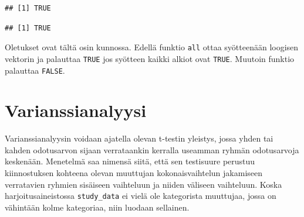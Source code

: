 \documentclass[
]{book}
\newenvironment{Shaded}{\begin{snugshade}}{\end{snugshade}}
\newcommand{\CommentTok}[1]{\textcolor[rgb]{0.56,0.35,0.01}{\textit{#1}}}
\newcommand{\DecValTok}[1]{\textcolor[rgb]{0.00,0.00,0.81}{#1}}
\newcommand{\FloatTok}[1]{\textcolor[rgb]{0.00,0.00,0.81}{#1}}
\newcommand{\FunctionTok}[1]{\textcolor[rgb]{0.00,0.00,0.00}{#1}}
\newcommand{\NormalTok}[1]{#1}
\newcommand{\OtherTok}[1]{\textcolor[rgb]{0.56,0.35,0.01}{#1}}
\newcommand{\SpecialCharTok}[1]{\textcolor[rgb]{0.00,0.00,0.00}{#1}}
\newcommand{\StringTok}[1]{\textcolor[rgb]{0.31,0.60,0.02}{#1}}
\begin{document}
\begin{verbatim}
## [1] TRUE
\end{verbatim}

\begin{Shaded}
\end{Shaded}

\begin{verbatim}
## [1] TRUE
\end{verbatim}

Oletukset ovat tältä osin kunnossa. Edellä funktio \texttt{all} ottaa syötteenään loogisen vektorin ja palauttaa \texttt{TRUE} jos syötteen kaikki alkiot ovat \texttt{TRUE}. Muutoin funktio palauttaa \texttt{FALSE}.

\hypertarget{anova}{%
\section{Varianssianalyysi}\label{anova}}

Varianssianalyysin voidaan ajatella olevan t-testin yleistys, jossa yhden tai kahden odotusarvon sijaan verrataankin kerralla useamman ryhmän odotusarvoja keskenään. Menetelmä saa nimensä siitä, että sen testisuure perustuu kiinnostuksen kohteena olevan muuttujan kokonaisvaihtelun jakamiseen verratavien ryhmien sisäiseen vaihteluun ja niiden väliseen vaihteluun. Koska harjoitusaineistossa \texttt{study\_data} ei vielä ole kategorista muuttujaa, jossa on vähintään kolme kategoriaa, niin luodaan sellainen.

\begin{Shaded}
\end{Shaded}
\end{document}
